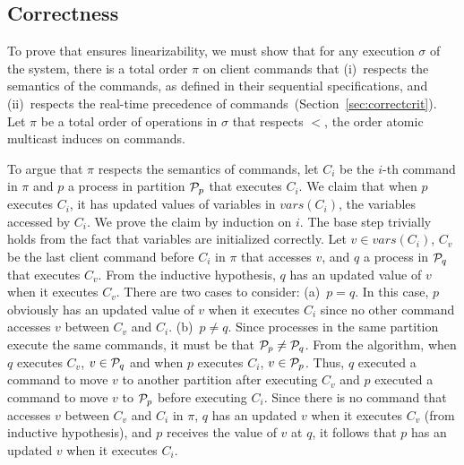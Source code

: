 \subsection{Correctness}
\label{sec:correctness}

\newcommand{\tsc}{\ensuremath{t^{cli}_{start}}}
\newcommand{\tec}{\ensuremath{t^{cli}_{end}}}
\newcommand{\tes}{\ensuremath{t^{srv}_{end}}}
\newcommand{\tss}{\ensuremath{t^{srv}_{start}}}

To prove that \dynastar ensures linearizability, we must show that for any execution $\sigma$ of the system, there is a total order $\pi$ on client commands that 
(i)~respects the semantics of the commands, as defined in their sequential specifications, and 
(ii)~respects the real-time precedence of commands~(Section~\ref{sec:correctcrit}).
%
Let $\pi$ be a total order of operations in $\sigma$ that respects $<$, the order atomic multicast induces on commands.

To argue that $\pi$ respects the semantics of  commands, let $C_i$ be the $i$-th command in $\pi$ and $p$ a process in partition $\mathcal{P}_p$ that executes $C_i$.
We claim that when $p$ executes $C_i$, it has updated values of variables in $vars(C_i)$, the variables accessed by $C_i$.
We prove the claim by induction on $i$.
The base step trivially holds from the fact that variables are initialized correctly.
Let $v \in vars(C_i)$, $C_v$ be the last client command before $C_i$ in $\pi$ that accesses $v$, and $q$ a process in $\mathcal{P}_q$ that executes $C_v$.
From the inductive hypothesis, $q$ has an updated value of $v$ when it executes $C_v$.
There are two cases to consider:
(a)~$p = q$. In this case, $p$ obviously has an updated value of $v$ when it executes $C_i$ since no other command accesses $v$ between $C_v$ and $C_i$.
(b)~$p \neq q$. 
Since processes in the same partition execute the same commands, it must be that $\mathcal{P}_p \neq \mathcal{P}_q$.
From the algorithm, when $q$ executes $C_v$, $v \in \mathcal{P}_q$ and when $p$ executes $C_i$, $v \in \mathcal{P}_p$.
Thus, $q$ executed a command to move $v$ to another partition after executing $C_v$ and $p$ executed a command to move $v$ to $\mathcal{P}_p$ before executing $C_i$.
Since there is no command that accesses $v$ between $C_v$ and $C_i$ in $\pi$, $q$ has an updated $v$ when it executes $C_v$ (from inductive hypothesis), and $p$ receives the value of $v$ at $q$, it follows that $p$ has an updated $v$ when it executes $C_i$.

